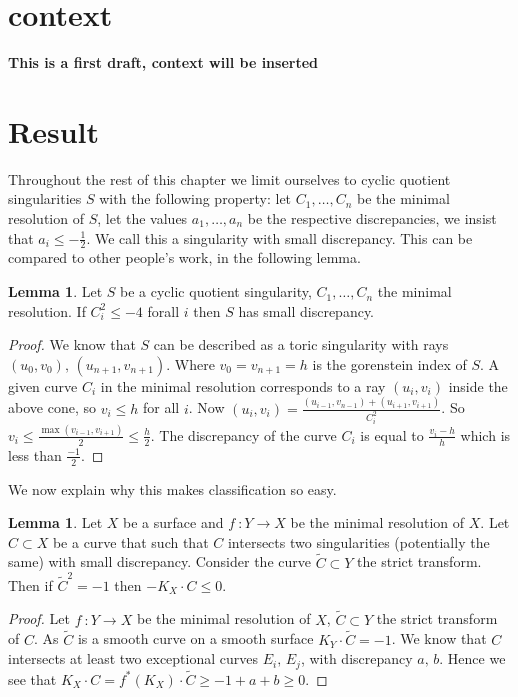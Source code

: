 \documentclass[11pt]{report}
\theoremstyle{definition}
\theoremstyle{definition}
\theoremstyle{definition}
\theoremstyle{definition}
\theoremstyle{definition}
\newtheorem{lem}[thm]{Lemma}
\theoremstyle{definition}
\theoremstyle{definition}
\theoremstyle{definition}
\begin{document}
 

\section{context}
\textbf{This is a first draft, context will be inserted}

\section{Result}

Throughout the rest of this chapter we limit ourselves to cyclic quotient singularities $S$ with the following property: let $C_1, \dots ,C_n$ be the minimal resolution of $S$, let the values $a_1, \dots ,a_n$ be the respective discrepancies, we insist that $a_i \leq -\frac{1}{2}$. We call this a singularity with small discrepancy. This can be compared to other people's work, in the following lemma.
\begin{lem}
Let $S$ be a cyclic quotient singularity, $C_1, \dots ,C_n$ the minimal resolution. If $C_i^2 \leq -4$ forall $i$ then $S$ has small discrepancy.
\end{lem}
\begin{proof}
We know that $S$ can be described as a toric singularity with rays $(u_0, v_0), \, (u_{n+1},v_{n+1})$. Where $v_0 = v_{n+1} = h$ is the gorenstein index of $S$. A given curve  $C_i$ in the minimal resolution corresponds to a ray $(u_i,v_i)$ inside the above cone, so $v_i \leq h$ for all $i$. Now $(u_i, v_i) = \frac{(u_{i-1}, v_{n-1}) + (u_{i+1}, v_{i+1})}{C_i^2}$. So $v_i \leq \frac{\max(v_{i-1}, v_{i+1})}{2} \leq \frac{h}{2}$. The discrepancy of the curve $C_i$ is equal to $\frac{v_i-h}{h}$ which is less than $\frac{-1}{2}$.
\end{proof}
We now explain why this makes classification so easy.
\begin{lem}
Let $X$ be a surface and  $f \: : Y \rightarrow X$ be the minimal resolution of $X$. Let $C \subset X$ be a curve that such that $C$ intersects two singularities (potentially the same) with small discrepancy. Consider the curve $\widetilde C \subset Y$ the strict transform. Then if $\widetilde C^2 = -1$ then $-K_X \cdot C \leq 0$.
\end{lem}
\begin{proof}
Let $f \: : Y \rightarrow X$ be the minimal resolution of $X$, $\widetilde C \subset Y$ the strict transform of $C$. As $\widetilde C$ is a smooth curve on a smooth surface $K_Y \cdot \widetilde C = -1$. We know that $C$ intersects at least two exceptional curves $E_i, \, E_j$, with discrepancy $a, \, b$. Hence we see that $K_X \cdot C = f^*(K_X) \cdot \widetilde C \geq -1 + a + b  \geq 0$. 
\end{proof}
\end{document}
